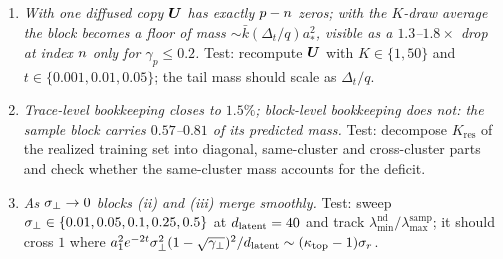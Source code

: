\begin{enumerate}
\item \emph{With one diffused copy $\bm{U}$ has exactly $p-n$ zeros; with the $K$-draw average the block becomes a floor of mass $\sim\bar k(\Delta_t/q)a_*^2$, visible as a $1.3$--$1.8\times$ drop at index $n$ only for $\gamma_p\le0.2$.} Test: recompute $\bm{U}$ with $K\in\{1,50\}$ and $t\in\{0.001,0.01,0.05\}$; the tail mass should scale as $\Delta_t/q$.
\item \emph{Trace-level bookkeeping closes to $1.5\%$; block-level bookkeeping does not: the sample block carries $0.57$--$0.81$ of its predicted mass.} Test: decompose $K_{\mathrm{res}}$ of the realized training set into diagonal, same-cluster and cross-cluster parts and check whether the same-cluster mass accounts for the deficit.
\item \emph{As $\sigma_{\perp}\to0$ blocks (ii) and (iii) merge smoothly.} Test: sweep $\sigma_{\perp}\in\{0.01,0.05,0.1,0.25,0.5\}$ at $d_{\mathrm{latent}}=40$ and track $\lambda^{\mathrm{nd}}_{\min}/\lambda^{\mathrm{samp}}_{\max}$; it should cross $1$ where $a_1^2e^{-2t}\sigma_{\perp}^2(1-\sqrt{\gamma_\perp})^2/d_{\mathrm{latent}}\sim(\kappa_{\mathrm{top}}-1)\sigma_r$.
\end{enumerate}


